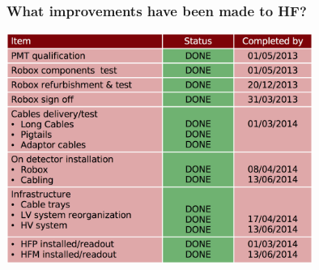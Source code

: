 \documentclass[bigger]{beamer}
\begin{document}
\begin{frame}
\frametitle{What improvements have been made to HF?}
\label{sec-3-1-2}
\label{sec-3-1-2-1}

\centering
\includegraphics[width=0.75\textwidth]{fig/hf_local/hf_commissioning.png}
\end{frame}
\end{document}
